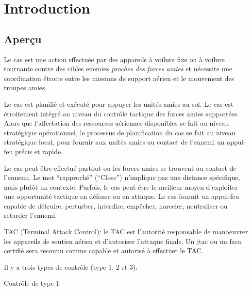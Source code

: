 \newpage

\sloppy

\chapter{Introduction}

\begin{center}
\end{center}


\section{Aperçu}

\e

    \item
    Le \acrfull{cas} est une action effectuée par des appareils à voilure fixe ou à voilure tournante contre des cibles enemies \emph{proches des forces amies} et nécessite une coordination étroite entre les missions de support aérien et le mouvement des troupes amies.
    \item
    Le \acrshort{cas} est planifié et exécuté pour appuyer les unités amies au sol. Le \acrshort{cas} est étroitement intégré au niveau du contrôle tactique des forces amies supportées. Alors que l'affectation des ressources aériennes disponibles se fait au niveau stratégique opérationnel, le processus de planification du \acrshort{cas} se fait au niveau stratégique local, pour fournir aux unités amies au contact de l'ennemi un appui-feu précis et rapide.
    \item
    Le \acrshort{cas} peut être effectué partout ou les forces amies se trouvent au contact de l'ennemi. Le mot ``rapproché'' (``Close'') n'implique pas une distance spécifique, mais plutôt un contexte. Parfois, le \acrshort{cas} peut être le meilleur moyen d'exploiter une opportunité tactique en défense ou en attaque. Le \acrshort{cas} fournit un appui-feu capable de détruire, perturber, interdire, empêcher, harceler, neutraliser ou retarder l'ennemi.
    \item
    TAC (Terminal Attack Control): le TAC est l'autorité responsable de manoeuvrer les appareils de soutien aérien et d'autoriser l'attaque finale. Un \acrshort{jtac} ou un \acrshort{faca} certifié sera reconnu comme capable et autorisé à effectuer le TAC.
    \item
    Il y a trois types de contrôle (type 1, 2 et 3):
    \ee
        \item
        Contrôle de type 1

